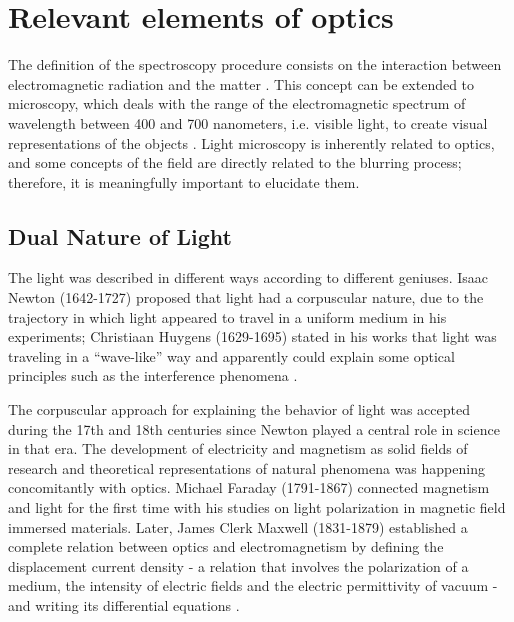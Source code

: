 \section{Relevant elements of optics}

The definition of the spectroscopy procedure consists on the interaction between electromagnetic radiation and the matter \cite{gauglitz2006handbook}. This concept can be extended to microscopy, which deals with the range of the electromagnetic spectrum of wavelength between 400 and 700 nanometers, i.e. visible light,  to create visual representations of the objects
\cite{bell2009introduction}. Light microscopy is inherently related to optics, and some concepts of the field are directly related to the blurring process; therefore, it is meaningfully important to elucidate them.

\subsection{Dual Nature of Light}

The light was described in different ways according to different geniuses. Isaac Newton (1642-1727) proposed that light had a corpuscular nature, due to the trajectory in which light appeared to travel in a uniform medium in his experiments; Christiaan Huygens (1629-1695) stated in his works that light was traveling in a ``wave-like'' way and apparently could explain some optical principles such as the interference phenomena \cite{fowles1989introduction}. 

The corpuscular approach for explaining the behavior of light was accepted during the 17th and 18th centuries since Newton played a central role in science in that era. The development of electricity and magnetism as solid fields of research and theoretical representations of natural phenomena was happening concomitantly with optics. Michael Faraday (1791-1867) connected magnetism and light for the first time with his studies on light polarization in magnetic field immersed materials. Later, James Clerk Maxwell (1831-1879) established a complete relation between optics and electromagnetism by defining the displacement current density - a relation that involves the polarization of a medium, the intensity of electric fields and the electric permittivity of vacuum - and writing its differential equations \cite{zilio2009optica}.

